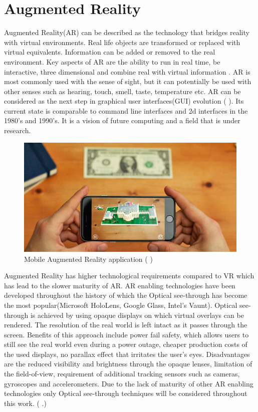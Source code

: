 \documentclass[12pt, a4paper,oneside, nocenter]{thesis}
\renewcommand{\citep}[1]{(\citeauthor{#1} \citeyear{#1}.)}
\renewcommand{\citeyearpar}[1]{(\citeauthor{#1} \citeyear{#1})}
\begin{document}
\section{Augmented Reality}%
Augmented Reality(AR) can be described as the technology that bridges reality with virtual environments. Real life objects are transformed or replaced with virtual equivalents. Information can be added or removed to the real environment. Key aspects of AR are the ability to run in real time, be interactive, three dimensional and combine real with virtual information . AR is most commonly used with the sense of sight, but it can potentially be used with other senses such as hearing, touch, smell, taste, temperature etc. AR can be considered as the next step in graphical user interfaces(GUI) evolution \citeyearpar{prototyping-ar}. Its current state is comparable to command line interfaces and 2d interfaces in the 1980's and 1990's. It is a vision of future computing and a field that is under research.
\begin{figure}[H]
	\includegraphics[width=\textwidth]{ar-application}
	\caption{Mobile Augmented Reality application \citeyearpar{ar-application-whitehouse}}
	\label{fig:ar-application}
\end{figure}
\par
Augmented Reality has higher technological requirements compared to VR which has lead to the slower maturity of AR. AR enabling technologies have been developed throughout the history of which the Optical see-through has become the most popular(Microsoft HoloLens, Google Glass, Intel's Vaunt). Optical see-through is achieved by using opaque displays on which virtual overlays can be rendered. The resolution of the real world is left intact as it passes through the screen. Benefits of this approach include power fail safety, which allows users to still see the real world even during a power outage, cheaper production costs of the used displays, no parallax effect that irritates the user's eyes. Disadvantages are the reduced visibility and brightness through the opaque lenses, limitation of the field-of-view, requirement of additional tracking sensors such as cameras, gyroscopes and accelerometers. Due to the lack of maturity of other AR enabling technologies only Optical see-through techniques will be considered throughout this work. \citep{vrjournal}
\end{document}
